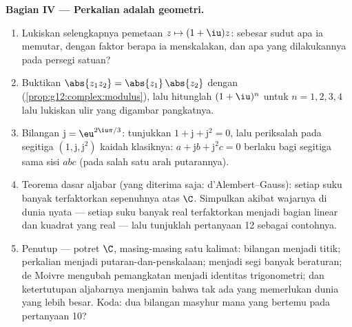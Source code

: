 \begin{problem}
\medskip
\noindent\textbf{Bagian IV --- Perkalian adalah geometri.}
\begin{enumerate}[resume]
  \item Lukiskan selengkapnya pemetaan $z \mapsto (1 + \iu)z$:
        sebesar sudut apa ia memutar, dengan faktor berapa ia
        menskalakan, dan apa yang dilakukannya pada persegi satuan?
  \item Buktikan $\abs{z_1 z_2} = \abs{z_1}\,\abs{z_2}$ dengan
         (\cref{prop:g12:complex:modulus}), lalu
        hitunglah $(1+\iu)^n$ untuk $n = 1, 2, 3, 4$ lalu lukiskan
        ulir yang digambar pangkatnya.
  \item Bilangan $\mathrm{j} = \eu^{2\iu\pi/3}$: tunjukkan
        $1 + \mathrm{j} + \mathrm{j}^2 = 0$, lalu periksalah pada segitiga
        $\left(1, \mathrm{j}, \mathrm{j}^2\right)$ kaidah klasiknya:
        $a + \mathrm{j} b + \mathrm{j}^2 c = 0$ berlaku bagi segitiga sama
        sisi $abc$ (pada salah satu arah putarannya).
  \item Teorema dasar aljabar (yang diterima saja:
        d'Alembert--Gauss): setiap suku banyak terfaktorkan sepenuhnya
        atas $\C$. Simpulkan akibat wajarnya di dunia nyata --- setiap
        suku banyak real terfaktorkan menjadi bagian linear dan kuadrat
        yang real --- lalu tunjuklah pertanyaan 12 sebagai contohnya.
  \item Penutup --- potret $\C$, masing-masing satu kalimat: bilangan
        menjadi titik; perkalian menjadi
        putaran-dan-penskalaan;  menjadi segi banyak
        beraturan; de Moivre mengubah pemangkatan menjadi identitas
        trigonometri; dan ketertutupan aljabarnya menjamin bahwa tak ada
         yang memerlukan dunia yang lebih besar. Koda: dua
        bilangan masyhur mana yang bertemu pada pertanyaan 10?

\end{enumerate}
\end{problem}
